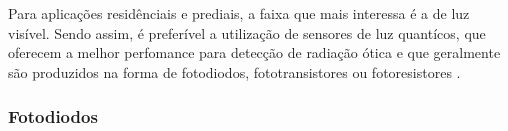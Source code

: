 Para aplicações residênciais e prediais, a faixa que mais interessa é a de luz visível. Sendo assim, é
preferível a utilização de sensores de luz quantícos, que oferecem a melhor perfomance para detecção de
radiação ótica e que geralmente são produzidos na forma de fotodiodos, fototransistores ou fotoresistores
\cite{fraden2010}.

\subsubsection{Fotodiodos}

